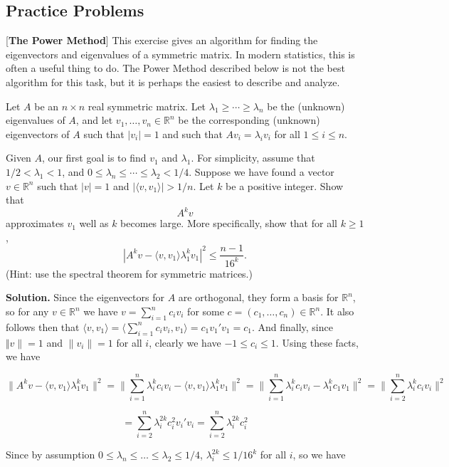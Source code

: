 \subsection{Practice Problems}

[\textbf{The Power Method}]
This exercise gives an algorithm for finding the eigenvectors and eigenvalues of a symmetric matrix.  In modern statistics, this is often a useful thing to do.  The Power Method described below is not the best algorithm for this task, but it is perhaps the easiest to describe and analyze.

Let $A$ be an $n\times n$ real symmetric matrix.  Let $\lambda_{1}\geq\cdots\geq\lambda_{n}$ be the (unknown) eigenvalues of $A$, and let $v_{1},\ldots,v_{n}\in\mathbb{R}^{n}$ be the corresponding (unknown) eigenvectors of $A$ such that $|v_{i}|=1$ and such that $A v_{i}=\lambda_{i}v_{i}$ for all $1\leq i\leq n$.

Given $A$, our first goal is to find $v_{1}$ and $\lambda_{1}$.  For simplicity, assume that $1/2<\lambda_{1}<1$, and $0\leq \lambda_{n}\leq\cdots\leq\lambda_{2}<1/4$.  Suppose we have found a vector $v\in\mathbb{R}^{n}$ such that $|v|=1$ and $|\langle v,v_{1}\rangle|>1/n$. Let $k$ be a positive integer.  Show that
$$A^{k}v$$
approximates $v_{1}$ well as $k$ becomes large.  More specifically, show that for all $k\geq1$,
$$|A^{k}v - \langle v,v_{1}\rangle\lambda_{1}^{k}v_{1}|^{2}\leq\frac{n-1}{16^{k}}.$$
(Hint: use the spectral theorem for symmetric matrices.)

\textbf{Solution.} Since the eigenvectors for \(A\) are orthogonal, they form a basis for \(\mathbb{R}^n\), so for any \(v \in \mathbb{R}^n\) we have \(v = \sum_{i=1}^n c_i v_i\) for some \(c = (c_1, \ldots, c_n) \in \mathbb{R}^n\). It also follows then that \(\langle v, v_1 \rangle = \langle   \sum_{i=1}^n c_i v_i, v_1 \rangle = c_1 v_1' v_1 = c_1\). And finally, since \(\Vert v \rVert = 1\) and \(\lVert v_i \rVert = 1\) for all \(i\), clearly we have \(-1 \leq c_i \leq 1\). Using these facts, we have 

\[
\lVert A^kv - \langle v, v_1 \rangle \lambda_1^k v_1 \rVert^2 = \lVert \sum_{i=1}^n \lambda_i^k c_i v_i - \langle v, v_1 \rangle \lambda_1^k v_1 \rVert^2  = \lVert \sum_{i=1}^n \lambda_i^k c_i v_i - \lambda_1^k c_1v_1 \rVert^2 = \lVert \sum_{i=2}^n \lambda_i^k c_i v_i  \rVert^2 
\]

\[
= \sum_{i=2}^n \lambda_i^{2k} c_i^2 v_i'v_i = \sum_{i=2}^n \lambda_i^{2k} c_i^2
\]

Since by assumption \(0 \leq \lambda_n \leq \ldots \leq \lambda_2 \leq 1/4\), \(\lambda_i^{2k} \leq 1/16^k\) for all \(i\), so we have

